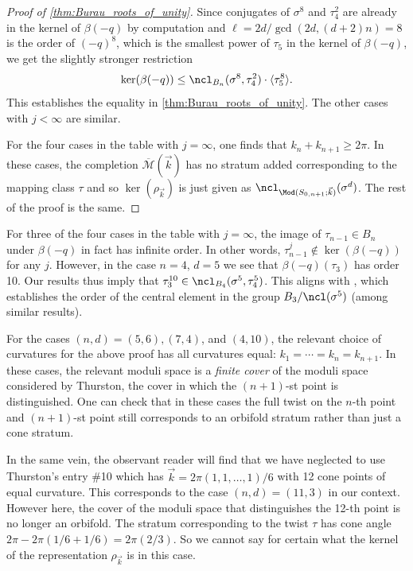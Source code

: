 \documentclass{amsart}
\begin{document}
\begin{proof}[Proof of \cref{thm:Burau_roots_of_unity}]
        Since conjugates of $\sigma^8$ and $\tau_4^2$ are already in the kernel of $\beta(-q)$ by computation and $\ell=2d/\gcd(2d,(d+2)n) = 8$ is the order of $(-q)^8$, which is the smallest power of $\tau_5$ in the kernel of $\beta(-q)$, we get the slightly stronger restriction
        \begin{equation*}
            \ker (\beta(-q)) \leq \ncl_{B_n}(\sigma^8,\tau_4^2) \cdot \langle \tau_5^8 \rangle.
        \end{equation*}
        This establishes the equality in \cref{thm:Burau_roots_of_unity}. The other cases with $j<\infty$ are similar.

        For the four cases in the table with $j=\infty$, one finds that $k_n+k_{n+1} \geq 2\pi$. In these cases, the completion $\overline{\mathcal M}(\vec k)$ has no stratum added corresponding to the mapping class $\tau$ and so $\ker (\rho_{\vec k})$ is just given as $\ncl_{\Mod(S_{0,n+1};\vec k)}(\sigma^d)$. The rest of the proof is the same.
    \end{proof}
    \begin{remark}
        For three of the four cases in the table with $j=\infty$, the image of $\tau_{n-1} \in B_n$ under $\beta(-q)$ in fact has infinite order. In other words, $\tau_{n-1}^j \notin \ker(\beta(-q))$ for any $j$. However, in the case $n=4$, $d=5$ we see that $\beta(-q)(\tau_3)$ has order 10. Our results thus imply that $\tau_3^{10} \in \ncl_{B_4}(\sigma^5,\tau_4^5 )$. This aligns with \cite[\S 11]{Coxeter1959FactorGroup}, which establishes the order of the central element in the group $B_3/\ncl(\sigma^5)$ (among similar results).
    \end{remark}
    \begin{remark}
        For the cases $(n,d)=(5,6),(7,4)$, and $(4,10)$, the relevant choice of curvatures for the above proof has all curvatures equal: $k_1=\dotsb = k_n=k_{n+1}$. In these cases, the relevant moduli space is a \textit{finite cover} of the moduli space considered by Thurston, the cover in which the $(n+1)$-st point is distinguished. One can check that in these cases the full twist on the $n$-th point and $(n+1)$-st point still corresponds to an orbifold stratum rather than just a cone stratum.
        
        In the same vein, the observant reader will find that we have neglected to use Thurston's entry \#10 which has $\vec k = 2\pi(1,1,\dotsc,1)/6$ with 12 cone points of equal curvature. This corresponds to the case $(n,d)=(11,3)$ in our context. However here, the cover of the moduli space that distinguishes the 12-th point is no longer an orbifold. The stratum corresponding to the twist $\tau$ has cone angle $2\pi-2\pi(1/6+1/6) = 2\pi (2/3)$. So we cannot say for certain what the kernel of the representation $\rho_{\vec k}$ is in this case.
    \end{remark}
    
\end{document}
